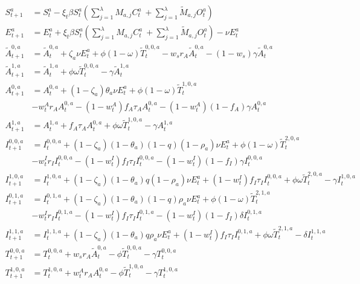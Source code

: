 \documentclass{article}
\begin{document}
{\allowdisplaybreaks
\begin{align}
S^a_{t+1} &= S^a_t - \xi_t\beta S^a_t \left(\sum_{j=1}^\lambda M_{a,j}C^a_t\ + \sum_{j=1}^\lambda \tilde{M}_{a,j}O^a_t\right) \label{eqn:sus} \\
E^a_{t+1} &= E^a_t + \xi_t\beta S^a_t \left(\sum_{j=1}^\lambda M_{a,j}C^a_t\ + \sum_{j=1}^\lambda \tilde{M}_{a,j}O^a_t\right) - \nu E^a_t \label{eqn:expo} \\
\tilde{A}^{0,a}_{t+1} &= \tilde{A}^{0,a}_t + \zeta_a\nu E^a_t + \phi(1-\omega)\tilde{T}^{0,0,a}_t - w_s r_A\tilde{A}^{0,a}_t - (1-w_s)\gamma\tilde{A}^{0,a}_t \label{eqn:asymp} \\
\tilde{A}^{1,a}_{t+1} &= \tilde{A}^{1,a}_t + \phi\omega\tilde{T}^{0,0,a}_t - \gamma\tilde{A}^{1,a}_t \label{eqn:asympiso} \\
A^{0,a}_{t+1} &= A^{0,a}_t + (1-\zeta_a)\theta_a\nu E^a_t + \phi(1-\omega)\tilde{T}^{1,0,a}_t \label{eqn:mild} \\
& - w^A_t r_A A^{0,a}_t - (1-w^A_t)f_A\tau_A A^{0,a}_t - (1-w^A_t)(1 - f_A)\gamma A^{0,a}_t \nonumber \\
A^{1,a}_{t+1} &= A^{1,a}_t + f_A\tau_A A^{0,a}_t + \phi\omega \tilde{T}^{1,0,a}_t - \gamma A^{1,a}_t \label{eqn:mildiso} \\
I^{0,0,a}_{t+1} &= I^{0,0,a}_t + (1-\zeta_a)(1-\theta_a)(1-q)(1-\rho_a)\nu E^a_t + \phi(1-\omega)\tilde{T}^{2,0,a}_t \label{eqn:sev} \\
& - w^I_t r_I I^{0,0,a}_t - (1-w^I_t)f_I\tau_I I^{0,0,a}_t - (1-w^I_t)(1-f_I)\gamma I^{0,0,a}_t \nonumber \\
I^{1,0,a}_{t+1} &= I^{1,0,a}_t + (1-\zeta_a)(1-\theta_a)q(1-\rho_a)\nu E^a_t + (1-w^I_t)f_I\tau_I I^{0,0,a}_t + \phi\omega \tilde{T}^{2,0,a}_t - \gamma I^{1,0,a}_t  \label{eqn:seviso} \\
I^{0,1,a}_{t+1} &= I^{0,1,a}_t + (1-\zeta_a)(1-\theta_a)(1-q)\rho_a\nu E^a_t + \phi(1-\omega)\tilde{T}^{2,1,a}_t \label{eqn:sevhosp} \\
& - w^I_t r_I I^{0,1,a}_t - (1-w^I_t)f_I\tau_I I^{0,1,a}_t - (1-w^I_t)(1-f_I)\delta I^{0,1,a}_t \nonumber \\
I^{1,1,a}_{t+1} &= I^{1,1,a}_t + (1-\zeta_a)(1-\theta_a)q\rho_a\nu E^a_t + (1-w^I_t)f_I\tau_I I^{0,1,a}_t + \phi\omega \tilde{T}^{2,1,a}_t - \delta I^{1,1,a}_t \label{eqn:sevisohosp} \\
T^{0,0,a}_{t+1} &= T^{0,0,a}_t + w_s r_A \tilde{A}^{0,a}_t - \phi \tilde{T}^{0,0,a}_t  - \gamma T^{0,0,a}_t \label{eqn:tasym} \\
T^{1,0,a}_{t+1} &= T^{1,0,a}_t + w^A_t r_A A^{0,a}_t - \phi \tilde{T}^{1,0,a}_t  - \gamma T^{1,0,a}_t \label{eqn:tmild} \\

\end{align}}
\end{document}
